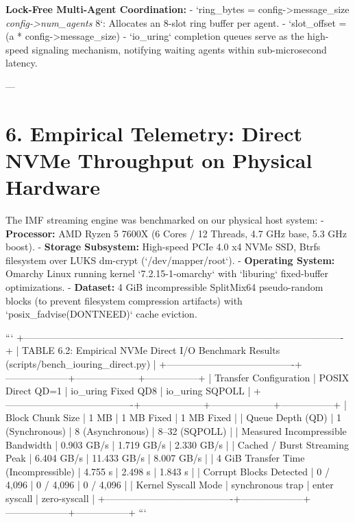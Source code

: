 \documentclass[11pt,twoside,openright]{amsbook}
\begin{document}
{{{{{{\textbf{Lock-Free Multi-Agent Coordination:}
- `ring_bytes = config->message_size \textit{ config->num_agents } 8`: Allocates an 8-slot ring buffer per agent.
- `slot_offset = (a * config->message_size) %
- `io_uring` completion queues serve as the high-speed signaling mechanism, notifying waiting agents within sub-microsecond latency.

---

\section{6. Empirical Telemetry: Direct NVMe Throughput on Physical Hardware}

The IMF streaming engine was benchmarked on our physical host system:
- \textbf{Processor:} AMD Ryzen 5 7600X (6 Cores / 12 Threads, 4.7 GHz base, 5.3 GHz boost).
- \textbf{Storage Subsystem:} High-speed PCIe 4.0 x4 NVMe SSD, Btrfs filesystem over LUKS dm-crypt (`/dev/mapper/root`).
- \textbf{Operating System:} Omarchy Linux running kernel `7.2.15-1-omarchy` with `liburing` fixed-buffer optimizations.
- \textbf{Dataset:} 4 GiB incompressible SplitMix64 pseudo-random blocks (to prevent filesystem compression artifacts) with `posix_fadvise(DONTNEED)` cache eviction.

```
+----------------------------------------------------------------------------------------------------+
| TABLE 6.2: Empirical NVMe Direct I/O Benchmark Results (scripts/bench_iouring_direct.py)          |
+----------------------------------------+--------------------+--------------------+-----------------+
| Transfer Configuration                 | POSIX Direct QD=1  | io_uring Fixed QD8 | io_uring SQPOLL |
+----------------------------------------+--------------------+--------------------+-----------------+
| Block Chunk Size                       | 1 MB               | 1 MB Fixed         | 1 MB Fixed      |
| Queue Depth (QD)                       | 1 (Synchronous)    | 8 (Asynchronous)   | 8–32 (SQPOLL)   |
| Measured Incompressible Bandwidth      | 0.903 GB/s         | 1.719 GB/s         | 2.330 GB/s      |
| Cached / Burst Streaming Peak          | 6.404 GB/s         | 11.433 GB/s        | 8.007 GB/s      |
| 4 GiB Transfer Time (Incompressible)   | 4.755 s            | 2.498 s            | 1.843 s         |
| Corrupt Blocks Detected                | 0 / 4,096          | 0 / 4,096          | 0 / 4,096       |
| Kernel Syscall Mode                    | synchronous trap   | enter syscall      | zero-syscall    |
+----------------------------------------+--------------------+--------------------+-----------------+
```

}}}}}}
\end{document}
